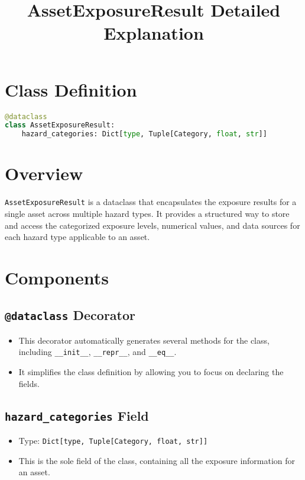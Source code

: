 \documentclass{article}
\title{AssetExposureResult Detailed Explanation}
\author{}
\date{}
\begin{document}
\maketitle

\section{Class Definition}

\begin{lstlisting}[language=Python]
@dataclass
class AssetExposureResult:
    hazard_categories: Dict[type, Tuple[Category, float, str]]
\end{lstlisting}

\section{Overview}

\texttt{AssetExposureResult} is a dataclass that encapsulates the exposure results for a single asset across multiple hazard types. It provides a structured way to store and access the categorized exposure levels, numerical values, and data sources for each hazard type applicable to an asset.

\section{Components}

\subsection{\texttt{@dataclass} Decorator}

\begin{itemize}
    \item This decorator automatically generates several methods for the class, including \texttt{\_\_init\_\_}, \texttt{\_\_repr\_\_}, and \texttt{\_\_eq\_\_}.
    \item It simplifies the class definition by allowing you to focus on declaring the fields.
\end{itemize}

\subsection{\texttt{hazard\_categories} Field}

\begin{itemize}
    \item Type: \texttt{Dict[type, Tuple[Category, float, str]]}
    \item This is the sole field of the class, containing all the exposure information for an asset.
\end{itemize}
\end{document}

